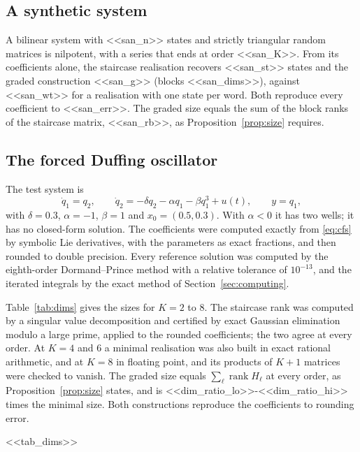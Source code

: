 \documentclass[11pt,a4paper]{article}
\theoremstyle{remark}
\begin{document}
\subsection{A synthetic system}
A bilinear system with <<san_n>> states and strictly triangular random matrices is nilpotent, with a series that ends at order <<san_K>>.
From its coefficients alone, the staircase realisation recovers <<san_st>> states and the graded construction <<san_g>> (blocks <<san_dims>>), against <<san_wt>> for a realisation with one state per word.
Both reproduce every coefficient to <<san_err>>.
The graded size equals the sum of the block ranks of the staircase matrix, <<san_rb>>, as Proposition~\ref{prop:size} requires.

\subsection{The forced Duffing oscillator}
The test system is
\begin{equation}\label{eq:duffing}
\dot q_1=q_2,\qquad \dot q_2=-\delta q_2-\alpha q_1-\beta q_1^3+u(t),\qquad y=q_1,
\end{equation}
with $\delta=0.3$, $\alpha=-1$, $\beta=1$ and $x_0=(0.5,0.3)$.
With $\alpha<0$ it has two wells; it has no closed-form solution.
The coefficients were computed exactly from \eqref{eq:cfs} by symbolic Lie derivatives, with the parameters as exact fractions, and then rounded to double precision.
Every reference solution was computed by the eighth-order Dormand--Prince method with a relative tolerance of $10^{-13}$, and the iterated integrals by the exact method of Section~\ref{sec:computing}.

Table~\ref{tab:dims} gives the sizes for $K=2$ to $8$.
The staircase rank was computed by a singular value decomposition and certified by exact Gaussian elimination modulo a large prime, applied to the rounded coefficients; the two agree at every order.
At $K=4$ and $6$ a minimal realisation was also built in exact rational arithmetic, and at $K=8$ in floating point, and its products of $K+1$ matrices were checked to vanish.
The graded size equals $\sum_\ell\operatorname{rank}H_\ell$ at every order, as Proposition~\ref{prop:size} states, and is <<dim_ratio_lo>>-<<dim_ratio_hi>> times the minimal size.
Both constructions reproduce the coefficients to rounding error.

\begin{table}[t]\centering\small
\caption{Sizes of the realisations of the Duffing series truncated at order $K$. Word tree: one state per word. Graded: block sizes $r_0,\dots,r_K$ and total. Error: largest difference between a reproduced and a true coefficient. Nilpotency: largest norm of a product of $K+1$ matrices.}\label{tab:dims}
<<tab_dims>>
\end{table}
\end{document}
